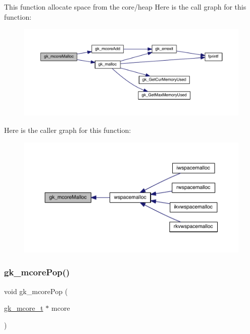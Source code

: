 This function allocate space from the core/heap Here is the call graph for this function\+:\nopagebreak
\begin{figure}[H]
\begin{center}
\leavevmode
\includegraphics[width=350pt]{a00107_ab7a380f0696a0d5421653fad336bcae0_cgraph}
\end{center}
\end{figure}
Here is the caller graph for this function\+:\nopagebreak
\begin{figure}[H]
\begin{center}
\leavevmode
\includegraphics[width=350pt]{a00107_ab7a380f0696a0d5421653fad336bcae0_icgraph}
\end{center}
\end{figure}
\mbox{\label{a00107_ac7b3189a2be11b6736dc4c27d3d30f3a}} 
\subsubsection{\texorpdfstring{gk\+\_\+mcore\+Pop()}{gk\_mcorePop()}}
{\footnotesize\ttfamily void gk\+\_\+mcore\+Pop (\begin{DoxyParamCaption}\item[{\hyperlink{a00682}{gk\+\_\+mcore\+\_\+t} $\ast$}]{mcore }\end{DoxyParamCaption})}

